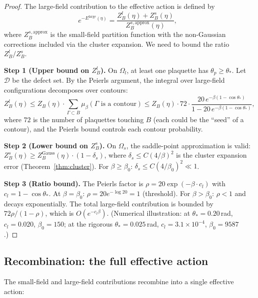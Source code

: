 \documentclass[11pt]{article}
\theoremstyle{definition}
\begin{document}
\begin{proof}
The large-field contribution to the effective action is defined by
\begin{equation}
e^{-E^{\mathrm{large}}(\eta)}
=\frac{Z_B^l(\eta)+Z_B^s(\eta)}{Z_B^{s,\mathrm{approx}}(\eta)},
\end{equation}
where $Z_B^{s,\mathrm{approx}}$ is the small-field partition function
with the non-Gaussian corrections included via the cluster expansion.
We need to bound the ratio $Z_B^l/Z_B^s$.

\textbf{Step 1 (Upper bound on $Z_B^l$).}
On $\Omega_l$, at least one plaquette has $\theta_p\ge\theta_*$.
Let $\mathcal{D}$ be the defect set.  By the Peierls argument, the
integral over large-field configurations decomposes over contours:
\begin{equation}
Z_B^l(\eta)\le Z_B(\eta)\cdot\sum_{\Gamma\subset B}
\mu_\beta(\Gamma\text{ is a contour})
\le Z_B(\eta)\cdot 72\cdot\frac{20\,e^{-\beta(1-\cos\theta_*)}}
{1-20\,e^{-\beta(1-\cos\theta_*)}},
\end{equation}
where $72$ is the number of plaquettes touching $B$ (each could
be the ``seed'' of a contour), and the Peierls bound controls each
contour probability.

\textbf{Step 2 (Lower bound on $Z_B^s$).}
On $\Omega_s$, the saddle-point approximation is valid:
$Z_B^s(\eta)\ge Z_B^{\mathrm{Gauss}}(\eta)\cdot(1-\delta_s)$,
where $\delta_s\le C(4/\beta)^2$ is the cluster expansion error
(Theorem~\ref{thm:cluster}).  For $\beta\ge\beta_0$:
$\delta_s\le C(4/\beta_0)^2\ll 1$.

\textbf{Step 3 (Ratio bound).}
The Peierls factor is
$\rho=20\exp(-\beta\cdot c_l)$ with $c_l=1-\cos\theta_*$.
At $\beta=\beta_0$: $\rho=20e^{-\log 20}=1$ (threshold).
For $\beta>\beta_0$: $\rho<1$ and decays exponentially.
The total large-field
contribution is bounded by $72\rho/(1-\rho)$, which is $O(e^{-c_l\beta})$.
(Numerical illustration: at $\theta_*=0.20$\,rad, $c_l=0.020$,
$\beta_0=150$; at the rigorous $\theta_*=0.025$\,rad,
$c_l=3.1\times 10^{-4}$, $\beta_0=9587$.)
\end{proof}

\subsection{Recombination: the full effective action}
\label{subsec:recombine}

The small-field and large-field contributions recombine into a single
effective action:
\end{document}
